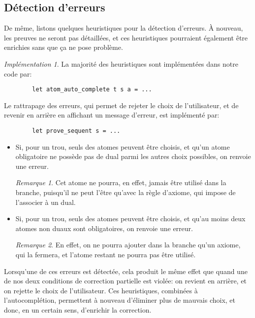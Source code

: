 \documentclass[11pt,a4paper]{article}
\theoremstyle{plain}
\theoremstyle{definition}
\theoremstyle{remark}
\newtheorem{remark}{Remarque}
\newtheorem{implementation}{Implémentation}
\begin{document}
\subsection{Détection d'erreurs}

De même, listons quelques heuristiques pour la détection d'erreurs. À nouveau, les preuves ne seront pas détaillées, et ces heuristiques pourraient également être enrichies sans que ça ne pose problème.

\begin{implementation}
    La majorité des heuristiques sont implémentées dans notre code par:

    \begin{verbatim}
        let atom_auto_complete t s a = ...
    \end{verbatim}
    
    Le rattrapage des erreurs, qui permet de rejeter le choix de l'utilisateur, et de revenir en arrière en affichant un message d'erreur, est implémenté par:

    \begin{verbatim}
        let prove_sequent s = ...
    \end{verbatim}
\end{implementation}

\begin{itemize}
    \item Si, pour un trou, seuls des atomes peuvent être choisis, et qu'un atome obligatoire ne possède pas de dual parmi les autres choix possibles, on renvoie une erreur.

    \begin{remark}
        Cet atome ne pourra, en effet, jamais être utilisé dans la branche, puisqu'il ne peut l'être qu'avec la règle d'axiome, qui impose de l'associer à un dual.
    \end{remark}

    \item Si, pour un trou, seuls des atomes peuvent être choisis, et qu'au moins deux atomes non duaux sont obligatoires, on renvoie une erreur.

    \begin{remark}
        En effet, on ne pourra ajouter dans la branche qu'un axiome, qui la fermera, et l'atome restant ne pourra pas être utilisé.
    \end{remark}
\end{itemize}

Lorsqu'une de ces erreurs est détectée, cela produit le même effet que quand une de nos deux conditions de correction partielle est violée: on revient en arrière, et on rejette le choix de l'utilisateur. Ces heuristiques, combinées à l'autocomplétion, permettent à nouveau d'éliminer plus de mauvais choix, et donc, en un certain sens, d'enrichir la correction.
\end{document}
